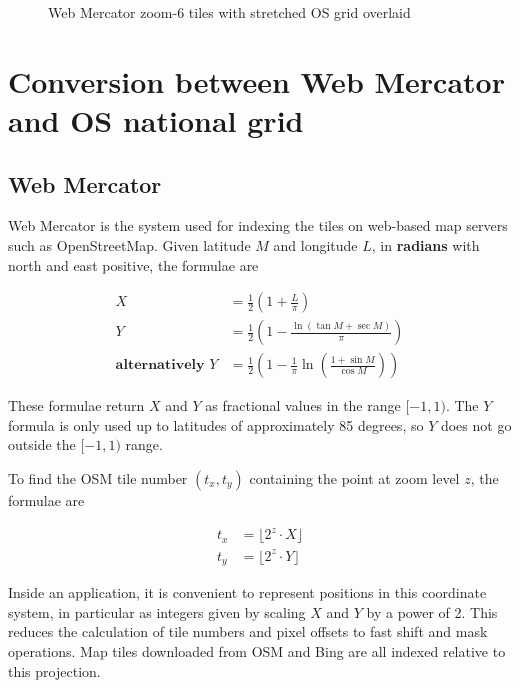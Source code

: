 \documentclass[10pt,a4paper]{article}
\begin{document}
\begin{figure}[t]
  \centering
  \fbox{
    
  }
  \caption{Web Mercator zoom-6 tiles with stretched OS grid overlaid}
  \label{fig:grid_os}
\end{figure}

\section {Conversion between Web Mercator and OS national grid}

\subsection {Web Mercator}
Web Mercator is the system used for indexing the tiles on web-based map servers
such as OpenStreetMap.  Given latitude $M$ and longitude $L$, in
\textbf{radians} with north and east positive, the formulae are 

\begin{align}
  X & = \frac{1}{2}\left(1 + \frac{L}{\pi} \right) \label{eqn:wmx} \\
  Y & = \frac{1}{2}\left(1 - \frac{
       \ln\left(\tan{M} + \sec{M}\right)
     }{\pi} \right) \label{eqn:wmy} \\
    \textbf{alternatively } Y & = \frac{1}{2} \left(
        1 - \frac{1}{\pi} \ln \left(
          \frac{1 + \sin{M}}{\cos{M}}
        \right)
        \right)
\end{align}

These formulae return $X$ and $Y$ as fractional values in the range $[-1,1)$.
The $Y$ formula is only used up to latitudes of approximately 85 degrees, so
$Y$ does not go outside the $[-1,1)$ range.

To find the OSM tile number $(t_x,t_y)$ containing the point at zoom level $z$,
the formulae are

\begin{align}
  t_x &= \lfloor 2^z \cdot X \rfloor \\
  t_y &= \lfloor 2^z \cdot Y \rfloor
\end{align}

Inside an application, it is convenient to represent positions in this
coordinate system, in particular as integers given by scaling $X$ and $Y$ by a
power of 2.  This reduces the calculation of tile numbers and pixel offsets to
fast shift and mask operations.  Map tiles downloaded from OSM and Bing are all
indexed relative to this projection.
\end{document}
